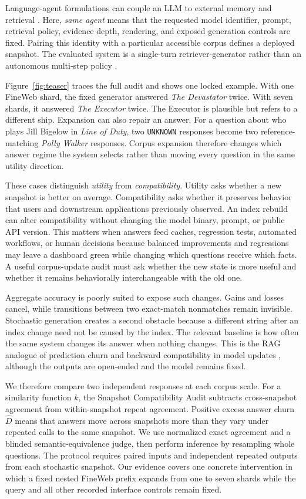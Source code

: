 \documentclass[sigconf,nonacm]{acmart}
\newcommand{\Dhat}{\widehat{D}}
\begin{document}
Language-agent formulations can couple an LLM to external memory and retrieval \cite{wu2024streambench}. Here, \emph{same agent} means that the requested model identifier, prompt, retrieval policy, evidence depth, rendering, and exposed generation controls are fixed. Pairing this identity with a particular accessible corpus defines a deployed snapshot. The evaluated system is a single-turn retriever-generator rather than an autonomous multi-step policy \cite{deng2026agenticrag}.

Figure~\ref{fig:teaser} traces the full audit and shows one locked example. With one FineWeb shard, the fixed generator answered \emph{The Devastator} twice. With seven shards, it answered \emph{The Executor} twice. The Executor is plausible but refers to a different ship. Expansion can also repair an answer. For a question about who plays Jill Bigelow in \emph{Line of Duty}, two \texttt{UNKNOWN} responses become two reference-matching \emph{Polly Walker} responses. Corpus expansion therefore changes which answer regime the system selects rather than moving every question in the same utility direction.

These cases distinguish \emph{utility} from \emph{compatibility}. Utility asks whether a new snapshot is better on average. Compatibility asks whether it preserves behavior that users and downstream applications previously observed. An index rebuild can alter compatibility without changing the model binary, prompt, or public API version. This matters when answers feed caches, regression tests, automated workflows, or human decisions because balanced improvements and regressions may leave a dashboard green while changing which questions receive which facts. A useful corpus-update audit must ask whether the new state is more useful and whether it remains behaviorally interchangeable with the old one.

Aggregate accuracy is poorly suited to expose such changes. Gains and losses cancel, while transitions between two exact-match nonmatches remain invisible. Stochastic generation creates a second obstacle because a different string after an index change need not be caused by the index. The relevant baseline is how often the same system changes its answer when nothing changes. This is the RAG analogue of prediction churn and backward compatibility in model updates \cite{fard2016churn,traeuble2021backward}, although the outputs are open-ended and the model remains fixed.

We therefore compare two independent responses at each corpus scale. For a similarity function $k$, the Snapshot Compatibility Audit subtracts cross-snapshot agreement from within-snapshot repeat agreement. Positive excess answer churn $\Dhat$ means that answers move across snapshots more than they vary under repeated calls to the same snapshot. We use normalized exact agreement and a blinded semantic-equivalence judge, then perform inference by resampling whole questions. The protocol requires paired inputs and independent repeated outputs from each stochastic snapshot. Our evidence covers one concrete intervention in which a fixed nested FineWeb prefix expands from one to seven shards while the query and all other recorded interface controls remain fixed.
\end{document}
